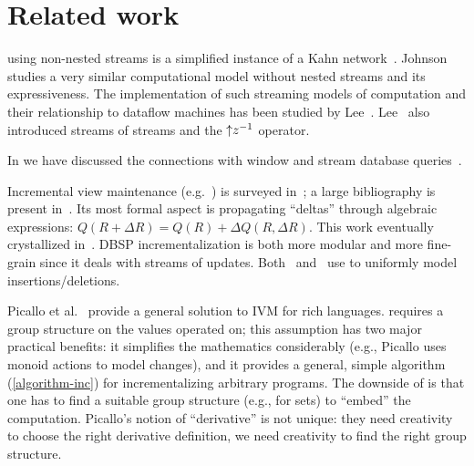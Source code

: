 \section{Related work}\label{sec:related}

\dbsp using non-nested streams is a simplified instance of a Kahn 
network~\cite{kahn-ifip74}.  Johnson~\cite{johnson-phd83}
studies a very similar computational model without nested streams and its 
expressiveness. The implementation of such streaming models of computation and their
relationship to dataflow machines has been studied by Lee~\cite{lee-ieee95}.
Lee~\cite{lee-ifip93} also introduced streams of streams and the ${\uparrow}z^{-1}$ operator.

In  we have discussed the connections with window and stream database 
queries~\cite{arasu-tr02,aurora}.

Incremental view maintenance (e.g.~\cite{gupta-idb93}) is
surveyed in~\cite{gupta-idb95}; a large bibliography is present in~\cite{motik-ai19}. 
Its most formal aspect is propagating ``deltas'' through algebraic expressions:
$Q(R+\Delta R)=Q(R)+\Delta Q(R,\Delta R)$. This work eventually crystallized in~\cite{koch-pods16}. DBSP 
incrementalization is both more modular and more fine-grain since it deals with streams of updates. 
Both~\cite{koch-pods10} and~\cite{green-tcs11} use \zrs to uniformly model insertions/deletions.

Picallo et al.~\cite{picallo-scop19} provide a general solution to IVM for
rich languages.  \dbsp requires a group structure on the values operated on; 
this assumption has two major practical benefits: it simplifies the mathematics considerably
(e.g., Picallo uses monoid actions to model changes), and it provides a general, simple
algorithm (\ref{algorithm-inc}) for incrementalizing arbitrary programs.  The downside of 
\dbsp is that one has to find a suitable group structure (e.g., \zrs for sets) to ``embed'' 
the computation.  Picallo's notion of ``derivative'' is not unique: they need creativity to choose
the right derivative definition, we need creativity to find the right group structure.

